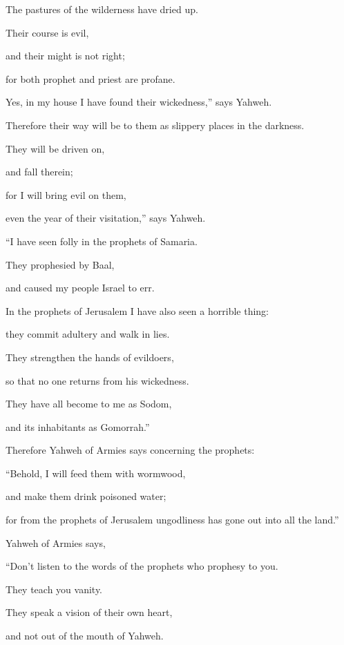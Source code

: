 {\par }{\Q The pastures of the wilderness have dried up.
\par }{\QB Their course is evil,
\par }{\QB and their might is not right;
\par }{\Q {}for both prophet and priest are profane.
\par }{\QB Yes, in my house I have found their wickedness,” says Yahweh.
\par }{\Q {}Therefore their way will be to them as slippery places in the darkness.
\par }{\QB They will be driven on,
\par }{\QB and fall therein;
\par }{\Q for I will bring evil on them,
\par }{\QB even the year of their visitation,” says Yahweh.
\par }{\BB \par }{\Q {}“I have seen folly in the prophets of Samaria.
\par }{\QB They prophesied by Baal,
\par }{\QB and caused my people Israel to err.
\par }{\Q {}In the prophets of Jerusalem I have also seen a horrible thing:
\par }{\QB they commit adultery and walk in lies.
\par }{\Q They strengthen the hands of evildoers,
\par }{\QB so that no one returns from his wickedness.
\par }{\Q They have all become to me as Sodom,
\par }{\QB and its inhabitants as Gomorrah.”
\par }{\PP {}Therefore Yahweh of Armies says concerning the prophets:
\par }{\Q “Behold, I will feed them with wormwood,
\par }{\QB and make them drink poisoned water;
\par }{\QB for from the prophets of Jerusalem ungodliness has gone out into all the land.”
\par }{\PP {}Yahweh of Armies says,
\par }{\Q “Don’t listen to the words of the prophets who prophesy to you.
\par }{\QB They teach you vanity.
\par }{\QB They speak a vision of their own heart,
\par }{\QB and not out of the mouth of Yahweh.
}
